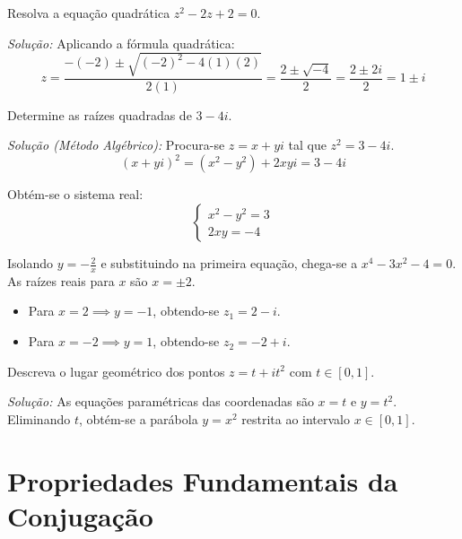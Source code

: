 \documentclass[12pt,a4paper]{article}
\begin{document}
\begin{exemplobox}
Resolva a equação quadrática $z^2 - 2z + 2 = 0$.

\textit{Solução:} Aplicando a fórmula quadrática:
\[
z = \frac{-(-2) \pm \sqrt{(-2)^2 - 4(1)(2)}}{2(1)} = \frac{2 \pm \sqrt{-4}}{2} = \frac{2 \pm 2i}{2} = 1 \pm i
\]
\end{exemplobox}

\begin{exemplobox}
Determine as raízes quadradas de $3 - 4i$.

\textit{Solução (Método Algébrico):} Procura-se $z = x + yi$ tal que $z^2 = 3 - 4i$.
\[
(x + yi)^2 = (x^2 - y^2) + 2xyi = 3 - 4i
\]

Obtém-se o sistema real:
\[
\begin{cases}
x^2 - y^2 = 3 \\
2xy = -4
\end{cases}
\]

Isolando $y = -\frac{2}{x}$ e substituindo na primeira equação, chega-se a $x^4 - 3x^2 - 4 = 0$. As raízes reais para $x$ são $x = \pm 2$.
\begin{itemize}
    \item Para $x = 2 \implies y = -1$, obtendo-se $z_1 = 2 - i$.
    \item Para $x = -2 \implies y = 1$, obtendo-se $z_2 = -2 + i$.
\end{itemize}
\end{exemplobox}

\begin{exemplobox}
Descreva o lugar geométrico dos pontos $z = t + it^2$ com $t \in [0, 1]$.

\textit{Solução:} As equações paramétricas das coordenadas são $x = t$ e $y = t^2$. Eliminando $t$, obtém-se a parábola $y = x^2$ restrita ao intervalo $x \in [0, 1]$.
\end{exemplobox}

\section{Propriedades Fundamentais da Conjugação}
\end{document}

